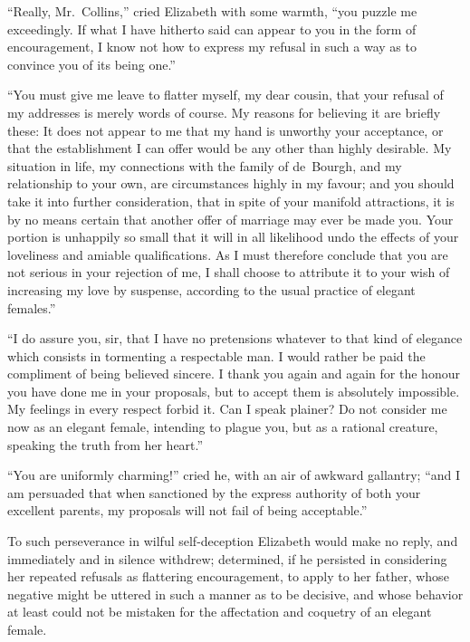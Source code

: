 ``Really, Mr.\ Collins,'' cried Elizabeth with some warmth, ``you
puzzle me exceedingly.  If what I have hitherto said can appear
to you in the form of encouragement, I know not how to express
my refusal in such a way as to convince you of its being one.''

``You must give me leave to flatter myself, my dear cousin, that
your refusal of my addresses is merely words of course.  My
reasons for believing it are briefly these: It does not appear
to me that my hand is unworthy your acceptance, or that the
establishment I can offer would be any other than highly
desirable.  My situation in life, my connections with the family
of de~Bourgh, and my relationship to your own, are circumstances
highly in my favour; and you should take it into further
consideration, that in spite of your manifold attractions, it is
by no means certain that another offer of marriage may ever be
made you.  Your portion is unhappily so small that it will in
all likelihood undo the effects of your loveliness and amiable
qualifications.  As I must therefore conclude that you are not
serious in your rejection of me, I shall choose to attribute it
to your wish of increasing my love by suspense, according to the
usual practice of elegant females.''

``I do assure you, sir, that I have no pretensions whatever to that
kind of elegance which consists in tormenting a respectable man.
I would rather be paid the compliment of being believed sincere.
I thank you again and again for the honour you have done me in
your proposals, but to accept them is absolutely impossible.  My
feelings in every respect forbid it.  Can I speak plainer?  Do not
consider me now as an elegant female, intending to plague you,
but as a rational creature, speaking the truth from her heart.''

``You are uniformly charming!'' cried he, with an air of awkward
gallantry; ``and I am persuaded that when sanctioned by the
express authority of both your excellent parents, my proposals
will not fail of being acceptable.''

To such perseverance in wilful self-deception Elizabeth would
make no reply, and immediately and in silence withdrew;
determined, if he persisted in considering her repeated
refusals as flattering encouragement, to apply to her father,
whose negative might be uttered in such a manner as to be
decisive, and whose behavior at least could not be mistaken
for the affectation and coquetry of an elegant female.




